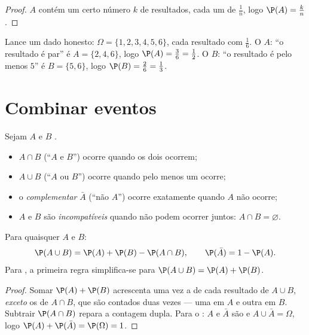 \begin{proof}
$A$ contém um certo número $k$ de resultados, cada um de 
$\frac1n$, logo $\P(A) = \frac kn$.
\end{proof}

\begin{example}\label{ex:g10:proba:die}
Lance um dado honesto: $\Omega = \{1, 2, 3, 4, 5, 6\}$, cada resultado
com  $\frac16$. O  $A$: ``o resultado é par'' é
$A = \{2, 4, 6\}$, logo $\P(A) = \frac36 = \frac12$. O  $B$: ``o
resultado é pelo menos $5$'' é $B = \{5, 6\}$, logo
$\P(B) = \frac26 = \frac13$.
\end{example}

\section{Combinar eventos}

\begin{definition}\label{def:g10:proba:operations}
Sejam $A$ e $B$ .
\begin{itemize}
  \item $A \cap B$ (``$A$ e $B$'') ocorre quando os dois ocorrem;
  \item $A \cup B$ (``$A$ ou $B$'') ocorre quando pelo menos um ocorre;
  \item o \emph{complementar} $\bar A$ (``não $A$'')
        ocorre exatamente quando $A$ não ocorre;
  \item $A$ e $B$ são \emph{incompatíveis} quando
        não podem ocorrer juntos: $A \cap B = \varnothing$.
\end{itemize}
\end{definition}

\begin{theorem}\label{thm:g10:proba:addition}
Para quaisquer  $A$ e $B$:
\[
\P(A \cup B) = \P(A) + \P(B) - \P(A \cap B),
\qquad
\P(\bar A) = 1 - \P(A) .
\]
Para  , a primeira regra simplifica-se para
$\P(A \cup B) = \P(A) + \P(B)$.
\end{theorem}

\begin{proof}
Somar $\P(A) + \P(B)$ acrescenta uma vez a  de cada
resultado de $A \cup B$, \emph{exceto} os de $A \cap B$, que são contados
duas vezes --- uma em $A$ e outra em $B$. Subtrair $\P(A \cap B)$ repara
a contagem dupla. Para o : $A$ e $\bar A$ são  e
$A \cup \bar A = \Omega$, logo $\P(A) + \P(\bar A) = \P(\Omega) = 1$.
\end{proof}

